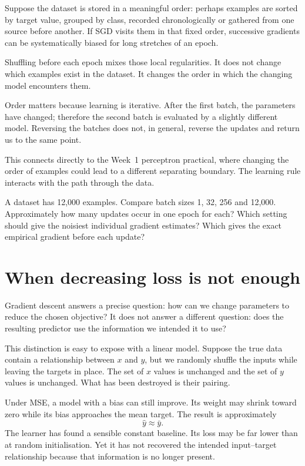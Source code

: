 Suppose the dataset is stored in a meaningful order: perhaps examples are sorted by target value, grouped by class, recorded chronologically or gathered from one source before another. If SGD visits them in that fixed order, successive gradients can be systematically biased for long stretches of an epoch.

Shuffling before each epoch mixes those local regularities. It does not change which examples exist in the dataset. It changes the order in which the changing model encounters them.

Order matters because learning is iterative. After the first batch, the parameters have changed; therefore the second batch is evaluated by a slightly different model. Reversing the batches does not, in general, reverse the updates and return us to the same point.

This connects directly to the Week~1 perceptron practical, where changing the order of examples could lead to a different separating boundary. The learning rule interacts with the path through the data.

\begin{checkpointbox}
A dataset has 12,000 examples. Compare batch sizes 1, 32, 256 and 12,000. Approximately how many updates occur in one epoch for each? Which setting should give the noisiest individual gradient estimates? Which gives the exact empirical gradient before each update?
\end{checkpointbox}

\section{When decreasing loss is not enough}

Gradient descent answers a precise question: how can we change parameters to reduce the chosen objective? It does not answer a different question: does the resulting predictor use the information we intended it to use?

This distinction is easy to expose with a linear model. Suppose the true data contain a relationship between \(x\) and \(y\), but we randomly shuffle the inputs while leaving the targets in place. The set of \(x\) values is unchanged and the set of \(y\) values is unchanged. What has been destroyed is their pairing.

Under MSE, a model with a bias can still improve. Its weight may shrink toward zero while its bias approaches the mean target. The result is approximately
\[
  \hat y \approx \bar y.
\]
The learner has found a sensible constant baseline. Its loss may be far lower than at random initialisation. Yet it has not recovered the intended input--target relationship because that information is no longer present.

